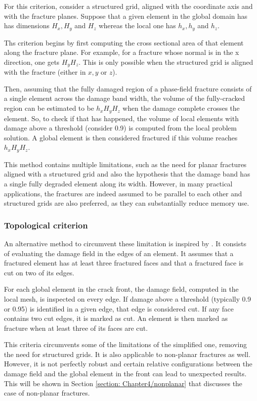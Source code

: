 For this criterion, consider a structured grid, aligned with the coordinate axis and with the fracture planes. Suppose that a given element in the global domain has has dimensions $H_x, H_y$ and $H_z$ whereas the local one has $h_x, h_y$ and $h_z$.

Ths criterion begins by first computing the cross sectional area of that element along the fracture plane. For example, for a fracture whose normal is in the x direction, one gets $H_yH_z$. This is only possible when the structured grid is aligned with the fracture (either in $x, y$ or $z$).

Then, assuming that the fully damaged region of a phase-field fracture consists of a single element across the damage band width, the volume of the fully-cracked region can be estimated to be $h_xH_yH_z$ when the damage complete crosses the element. So, to check if that has happened, the volume of local elements with damage above a threshold (consider 0.9) is computed from the local problem solution. A global element is then considered fractured if this volume reaches $h_xH_yH_z$.

This method contains multiple limitations, such as the need for planar fractures aligned with a structured grid and also the hypothesis that the damage band has a single fully degraded element along its width. However, in many practical applications, the fractures are indeed assumed to be parallel to each other and structured grids are also preferred, as they can substantially reduce memory use. 

\subsubsection{Topological criterion}

An alternative method to circumvent these limitation is inspired by \cite{muixi2021combined}. It consists of evaluating the damage field in the edges of an element. It assumes that a fractured element has at least three fractured faces and that a fractured face is cut on two of its edges.

For each global element in the crack front, the damage field, computed in the local mesh, is inspected on every edge. If damage above a threshold (typically 0.9 or 0.95) is identified in a given edge, that edge is considered cut. If any face contains two cut edges, it is marked as cut. An element is then marked as fracture when at least three of its faces are cut.

This criteria circumvents some of the limitations of the simplified one, removing the need for structured grids. It is also applicable to non-planar fractures as well. However, it is not perfectly robust and certain relative configurations between the damage field and the global element in the front can lead to unexpected results. This will be shown in Section \ref{section: Chapter4/nonplanar} that discusses the case of non-planar fractures.
